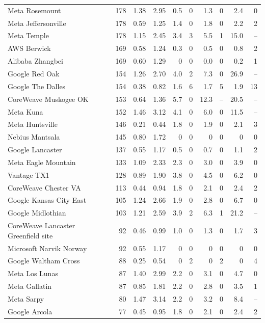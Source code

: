 {\begin{longtable}{@{}lrrrrrrrrr@{}}
Meta Rosemount & 178 & 1.38 & 2.95 & 0.5 & 0 & 1.3 & 0 & 2.4 & 0 \\
Meta Jeffersonville & 178 & 0.59 & 1.25 & 1.4 & 0 & 1.8 & 0 & 2.2 & 2 \\
Meta Temple & 178 & 1.15 & 2.45 & 3.4 & 3 & 5.5 & 1 & 15.0 & -- \\
AWS Berwick & 169 & 0.58 & 1.24 & 0.3 & 0 & 0.5 & 0 & 0.8 & 2 \\
Alibaba Zhangbei & 169 & 0.60 & 1.29 & 0 & 0 & 0.0 & 0 & 0.2 & 1 \\
Google Red Oak & 154 & 1.26 & 2.70 & 4.0 & 2 & 7.3 & 0 & 26.9 & -- \\
Google The Dalles & 154 & 0.38 & 0.82 & 1.6 & 6 & 1.7 & 5 & 1.9 & 13 \\
CoreWeave Muskogee OK & 153 & 0.64 & 1.36 & 5.7 & 0 & 12.3 & -- & 20.5 & -- \\
Meta Kuna & 152 & 1.46 & 3.12 & 4.1 & 0 & 6.0 & 0 & 11.5 & -- \\
Meta Huntsville & 146 & 0.21 & 0.44 & 1.8 & 0 & 1.9 & 0 & 2.1 & 3 \\
Nebius Mantsala & 145 & 0.80 & 1.72 & 0 & 0 & 0 & 0 & 0 & 0 \\
Google Lancaster & 137 & 0.55 & 1.17 & 0.5 & 0 & 0.7 & 0 & 1.1 & 2 \\
Meta Eagle Mountain & 133 & 1.09 & 2.33 & 2.3 & 0 & 3.0 & 0 & 3.9 & 0 \\
Vantage TX1 & 128 & 0.89 & 1.90 & 3.8 & 0 & 4.5 & 0 & 6.2 & 0 \\
CoreWeave Chester VA & 113 & 0.44 & 0.94 & 1.8 & 0 & 2.1 & 0 & 2.4 & 2 \\
Google Kansas City East & 105 & 1.24 & 2.66 & 1.9 & 0 & 2.8 & 0 & 6.7 & 0 \\
Google Midlothian & 103 & 1.21 & 2.59 & 3.9 & 2 & 6.3 & 1 & 21.2 & -- \\
CoreWeave Lancaster Greenfield site & 92 & 0.46 & 0.99 & 1.0 & 0 & 1.3 & 0 & 1.7 & 3 \\
Microsoft Narvik Norway & 92 & 0.55 & 1.17 & 0 & 0 & 0 & 0 & 0 & 0 \\
Google Waltham Cross & 88 & 0.25 & 0.54 & 0 & 2 & 0 & 2 & 0 & 4 \\
Meta Los Lunas & 87 & 1.40 & 2.99 & 2.2 & 0 & 3.1 & 0 & 4.7 & 0 \\
Meta Gallatin & 87 & 0.85 & 1.81 & 2.2 & 0 & 2.8 & 0 & 3.5 & 1 \\
Meta Sarpy & 80 & 1.47 & 3.14 & 2.2 & 0 & 3.2 & 0 & 8.4 & -- \\
Google Arcola & 77 & 0.45 & 0.95 & 1.8 & 0 & 2.1 & 0 & 2.4 & 2 \\

\end{longtable}}
